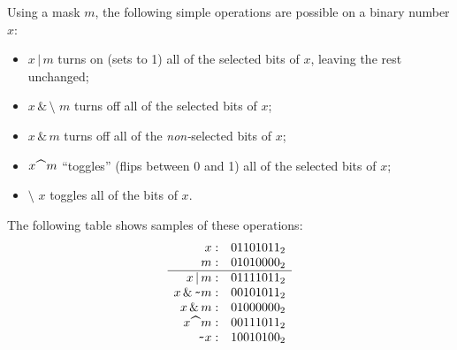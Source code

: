 Using a mask $m$, the following simple operations are possible on a binary number $x$:
\begin{itemize}
\item $x\,|\,m$ turns on (sets to 1) all of the selected bits of $x$,
leaving the rest unchanged;
\item $x\,\&\,\texttt{\char`\~}m$ turns off all of the selected bits of $x$;
\item $x\,\&\,m$ turns off all of the \emph{non-}selected bits of $x$;
\item $x\,\Caret\,m$ ``toggles'' (flips between 0 and 1) all of the selected bits of $x$;
\item $\texttt{\char`\~}x$ toggles all of the bits of $x$.
\end{itemize}
The following table shows samples of these operations:
\[ \begin{array}{rl}
x:                         & 01101011_2\\
m:                         & 01010000_2\\ \hline
x\,|\,m:                   & 01111011_2\\
x\,\&\,\texttt{\char`\~}m: & 00101011_2\\
x\,\&\,m:                  & 01000000_2\\
x\,\Caret\,m:              & 00111011_2\\
\texttt{\char`\~}x:        & 10010100_2
\end{array} \]

